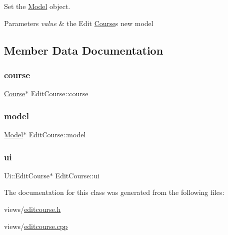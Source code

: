 Set the \hyperlink{classModel}{Model} object. 


\begin{DoxyParams}{Parameters}
{\em value} & the Edit \hyperlink{classCourse}{Course}\textquotesingle{}s new model \\
\hline
\end{DoxyParams}


\subsection{Member Data Documentation}
\mbox{\label{classEditCourse_af20120b1d0fe619456bf49b23002c3a1}} 
\subsubsection{\texorpdfstring{course}{course}}
{\footnotesize\ttfamily \hyperlink{classCourse}{Course}$\ast$ Edit\+Course\+::course\hspace{0.3cm}{\ttfamily [private]}}

\mbox{\label{classEditCourse_a7dfc909dd668bd50ba3653f7a8d77d34}} 
\subsubsection{\texorpdfstring{model}{model}}
{\footnotesize\ttfamily \hyperlink{classModel}{Model}$\ast$ Edit\+Course\+::model\hspace{0.3cm}{\ttfamily [private]}}

\mbox{\label{classEditCourse_a22a699a4ebce678c8837e9ae4f0aeed2}} 
\subsubsection{\texorpdfstring{ui}{ui}}
{\footnotesize\ttfamily Ui\+::\+Edit\+Course$\ast$ Edit\+Course\+::ui\hspace{0.3cm}{\ttfamily [private]}}



The documentation for this class was generated from the following files\+:\begin{DoxyCompactItemize}
\item 
views/\hyperlink{editcourse_8h}{editcourse.\+h}\item 
views/\hyperlink{editcourse_8cpp}{editcourse.\+cpp}\end{DoxyCompactItemize}
